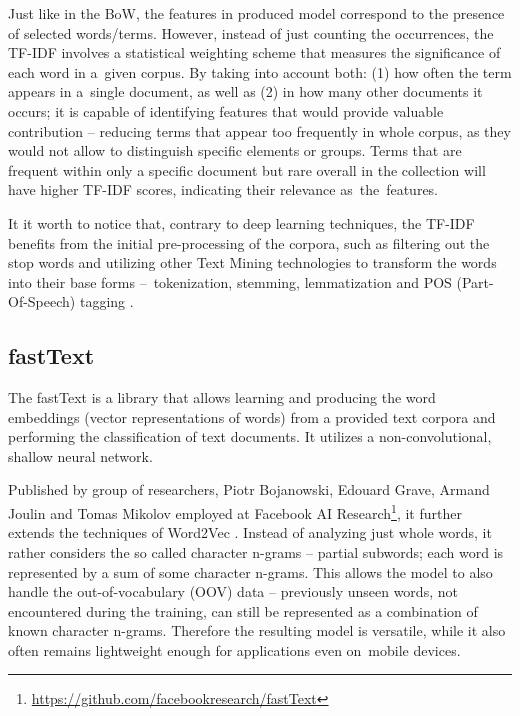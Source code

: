 Just like in the BoW, the features in produced model correspond to the presence of selected words/terms. However, instead of just counting the occurrences, the TF-IDF involves a statistical weighting scheme that measures the significance of each word in a~given corpus. By taking into account both: (1) how often the term appears in a~single document, as well as (2) in how many other documents it occurs; it is capable of identifying features that would provide valuable contribution – reducing terms that appear too frequently in whole corpus, as they would not allow to distinguish specific elements or groups. Terms that are frequent within only a specific document but rare overall in the collection will have higher TF-IDF scores, indicating their relevance as~the~features.

It it worth to notice that, contrary to deep learning techniques, the TF-IDF benefits from the initial pre-processing of the corpora, such as filtering out the stop words and utilizing other Text Mining technologies to transform the words into their base forms –~tokenization, stemming, lemmatization and POS (Part-Of-Speech) tagging \cite{Hotho-2005}\cite{Vijayarani-2015}.


\subsection{fastText}
\label{section:fastText}

The fastText is a library that allows learning and producing the word embeddings (vector representations of words) from a provided text corpora and performing the classification of text documents. It utilizes a non-convolutional, shallow neural network.

Published by group of researchers, Piotr Bojanowski, Edouard Grave, Armand Joulin and Tomas Mikolov \cite{Bojanowski-2017}\cite{Joulin-2016} employed at Facebook AI Research\footnote{\url{https://github.com/facebookresearch/fastText}}, it further extends the techniques of Word2Vec \cite{Mikolov-2013}. Instead of analyzing just whole words, it rather considers the so called character n-grams – partial subwords; each word is represented by a sum of some character n-grams. This allows the model to also handle the out-of-vocabulary (OOV) data – previously unseen words, not encountered during the training, can still be represented as a combination of known character n-grams. Therefore the resulting model is versatile, while it also often remains lightweight enough for applications even on~mobile devices.
